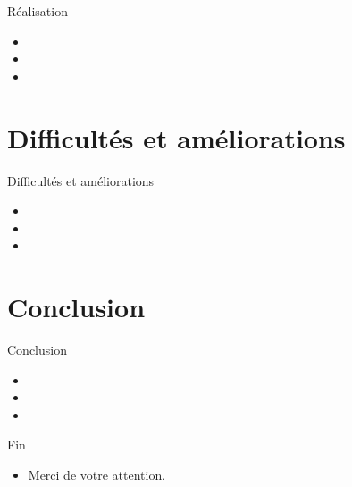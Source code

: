 \documentclass{beamer}
\begin{document}
\begin{frame}{\textcolor{bleu2}{Réalisation}}
	\begin{itemize}
	\item 
	\item 
	\item 
	\end{itemize}
\end{frame}

\section{Difficultés et améliorations}

\begin{frame}{\textcolor{bleu2}{Difficultés et améliorations}}
	\begin{itemize}
	\item 
	\item 
	\item 
	\end{itemize}
\end{frame}

\section{Conclusion}

\begin{frame}{\textcolor{bleu2}{Conclusion}}
	\begin{itemize}
	\item 
	\item 
	\item 
	\end{itemize}
\end{frame}





\begin{frame}{\textcolor{bleu2}{Fin}}
	\begin{itemize}
 		\item Merci de votre attention.   
 	\end{itemize}
\end{frame}
\end{document}
